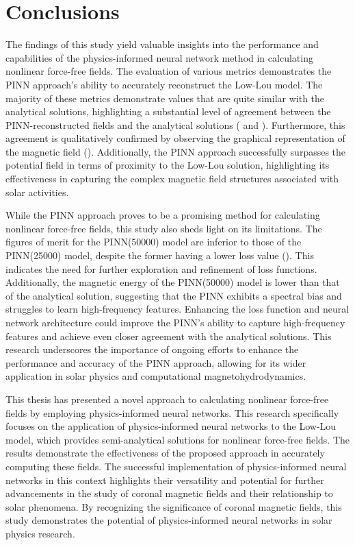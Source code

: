 
\section{Conclusions}


The findings of this study yield valuable insights into the performance and capabilities of the physics-informed neural network method in calculating nonlinear force-free fields. The evaluation of various metrics demonstrates the PINN approach's ability to accurately reconstruct the Low-Lou model. The majority of these metrics demonstrate values that are quite similar with the analytical solutions, highlighting a substantial level of agreement between the PINN-reconstructed fields and the analytical solutions ( and ). Furthermore, this agreement is qualitatively confirmed by observing the graphical representation of the magnetic field (). Additionally, the PINN approach successfully surpasses the potential field in terms of proximity to the Low-Lou solution, highlighting its effectiveness in capturing the complex magnetic field structures associated with solar activities.

While the PINN approach proves to be a promising method for calculating nonlinear force-free fields, this study also sheds light on its limitations. The figures of merit for the PINN(50000) model are inferior to those of the PINN(25000) model, despite the former having a lower loss value (). This indicates the need for further exploration and refinement of loss functions. Additionally, the magnetic energy of the PINN(50000) model is lower than that of the analytical solution, suggesting that the PINN exhibits a spectral bias and struggles to learn high-frequency features. Enhancing the loss function and neural network architecture could improve the PINN's ability to capture high-frequency features and achieve even closer agreement with the analytical solutions. This research underscores the importance of ongoing efforts to enhance the performance and accuracy of the PINN approach, allowing for its wider application in solar physics and computational magnetohydrodynamics.

This thesis has presented a novel approach to calculating nonlinear force-free fields by employing physics-informed neural networks. This research specifically focuses on the application of physics-informed neural networks to the Low-Lou model, which provides semi-analytical solutions for nonlinear force-free fields. The results demonstrate the effectiveness of the proposed approach in accurately computing these fields. The successful implementation of physics-informed neural networks in this context highlights their versatility and potential for further advancements in the study of coronal magnetic fields and their relationship to solar phenomena. By recognizing the significance of coronal magnetic fields, this study demonstrates the potential of physics-informed neural networks in solar physics research.